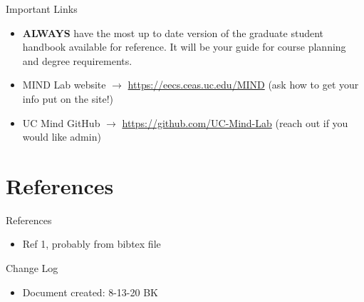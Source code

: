 \documentclass[handout]{beamer}
\begin{document}
\begin{frame}{Important Links}
\begin{itemize}
  \item \textbf{ALWAYS} have the most up to date version of the graduate student handbook available for reference. It will be your guide for course planning and degree requirements.
  \item MIND Lab website $\rightarrow$  \url{https://eecs.ceas.uc.edu/MIND} (ask how to get your info put on the site!)
  \item UC Mind GitHub $\rightarrow$ \url{https://github.com/UC-Mind-Lab} (reach out if you would like admin)
\end{itemize}
\end{frame}



\section{References}
\begin{frame}{References}
\begin{itemize}
  \item Ref 1, probably from bibtex file
\end{itemize}
\end{frame}

\begin{frame}{Change Log}
\begin{itemize}
  \item Document created: 8-13-20 BK
\end{itemize}
\end{frame}
\end{document}
